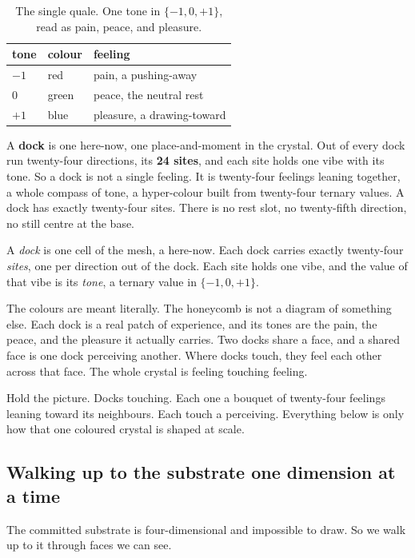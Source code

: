 \begin{table}[ht]
\centering
\begin{tabular}{@{}lll@{}}
\toprule
tone & colour & feeling \\
\midrule
$-1$ & red & pain, a pushing-away \\
$0$ & green & peace, the neutral rest \\
$+1$ & blue & pleasure, a drawing-toward \\
\bottomrule
\end{tabular}
\caption{The single quale. One tone in $\{-1, 0, +1\}$, read as pain, peace, and pleasure.}
\label{tab:tone}
\end{table}

A \textbf{dock} is one here-now, one place-and-moment in the crystal. Out of every dock run twenty-four directions, its \textbf{24 sites}, and each site holds one vibe with its tone. So a dock is not a single feeling. It is twenty-four feelings leaning together, a whole compass of tone, a hyper-colour built from twenty-four ternary values. A dock has exactly twenty-four sites. There is no rest slot, no twenty-fifth direction, no still centre at the base.

\begin{definition}
A \emph{dock} is one cell of the mesh, a here-now. Each dock carries exactly twenty-four \emph{sites}, one per direction out of the dock. Each site holds one vibe, and the value of that vibe is its \emph{tone}, a ternary value in $\{-1, 0, +1\}$.
\end{definition}

The colours are meant literally. The honeycomb is not a diagram of something else. Each dock is a real patch of experience, and its tones are the pain, the peace, and the pleasure it actually carries. Two docks share a face, and a shared face is one dock perceiving another. Where docks touch, they feel each other across that face. The whole crystal is feeling touching feeling.

Hold the picture. Docks touching. Each one a bouquet of twenty-four feelings leaning toward its neighbours. Each touch a perceiving. Everything below is only how that one coloured crystal is shaped at scale.

\subsection{Walking up to the substrate one dimension at a time}

The committed substrate is four-dimensional and impossible to draw. So we walk up to it through faces we can see.

